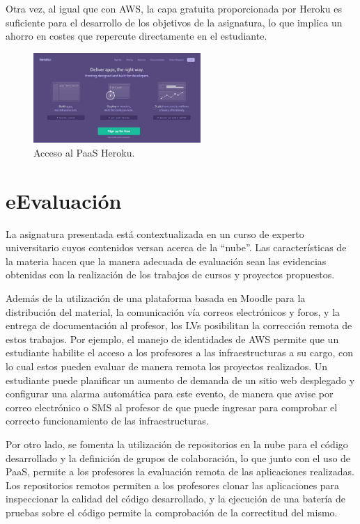 \documentclass[conference]{IEEEtran}
\begin{document}
Otra vez, al igual que con AWS, la capa gratuita proporcionada por Heroku es suficiente para el desarrollo de los objetivos 
de la asignatura, lo que implica un ahorro en costes que repercute directamente en el estudiante.

\begin{figure}[!t]
\centering
\includegraphics[width=2.5in]{heroku.jpeg}
\caption{Acceso al PaaS Heroku.}
\label{fig:heroku}
\end{figure}




\section{eEvaluación
\label{sec:eValuacion}}

La asignatura presentada está contextualizada en un curso de experto universitario cuyos contenidos versan acerca de la ``nube''.
Las características de la materia hacen que la manera adecuada de evaluación sean las evidencias obtenidas con la realización de los trabajos de cursos y proyectos propuestos.

Además de la utilización de una plataforma basada en Moodle para la distribución del material, la comunicación vía correos electrónicos y foros, y la entrega de documentación al profesor,
los LVs posibilitan la corrección remota de estos trabajos. Por ejemplo, el manejo de identidades de AWS permite que un estudiante habilite el acceso a los profesores a las infraestructuras a su cargo,
con lo cual estos pueden evaluar de manera remota los proyectos realizados.
Un estudiante puede planificar un aumento de demanda de un sitio web desplegado y configurar una alarma automática para este evento,
de manera que avise por correo electrónico o SMS al profesor de que puede ingresar para 
comprobar el correcto funcionamiento de las infraestructuras.


Por otro lado, se fomenta la utilización de repositorios en la nube para el código desarrollado y la definición de grupos de colaboración, lo que junto con el uso de PaaS, 
permite a los profesores la evaluación remota de las aplicaciones realizadas.
Los repositorios remotos permiten a los profesores clonar las aplicaciones para inspeccionar la calidad del código desarrollado, y
la ejecución de una batería de pruebas sobre el código permite la comprobación de la correctitud del mismo. 
\end{document}
